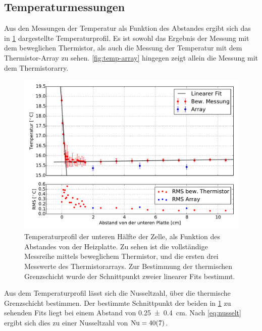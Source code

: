 \subsection{Temperaturmessungen}
Aus den Messungen der Temperatur als Funktion des Abstandes ergibt sich das in \cref{fig:temp-prof} dargestellte Temperaturprofil. Es ist sowohl das Ergebnis der Messung mit dem beweglichen Thermistor, als auch die Messung der Temperatur mit dem Thermistor-Array zu sehen. 
\cref{fig:temp-array} hingegen zeigt allein die Messung mit dem Thermistorarry.
\\
\begin{figure}
\centering
\includegraphics[width=\textwidth]{plots/T_profile2.pdf}
\caption{Temperaturprofil der unteren Hälfte der Zelle, als Funktion des Abstandes von der Heizplatte. Zu sehen ist die vollständige Messreihe mittels beweglichem Thermistor, und die ersten drei Messwerte des Thermistorarrays.
Zur Bestimmung der thermischen Grenzschicht wurde der Schnittpunkt zweier linearer Fits bestimmt.}\label{fig:temp-prof}
\end{figure}
Aus dem Temperaturprofil lässt sich die Nusseltzahl, über die thermische Grenzschicht bestimmen. Der bestimmte Schnittpunkt der beiden in \cref{fig:temp-prof} zu sehenden Fits liegt bei einem Abstand von \SI{0.25\pm0.4}{\centi\meter}. Nach \cref{eq:nusselt} ergibt sich dies zu einer Nusseltzahl von $\text{Nu}=\SI{40\pm7}{}$.
\\

